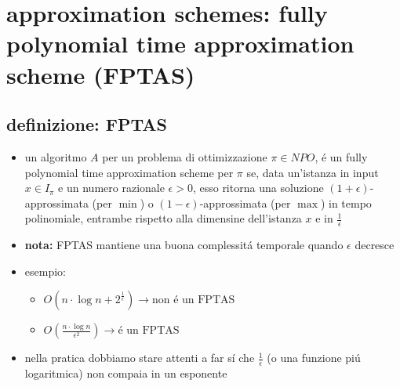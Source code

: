 \section*{approximation schemes: fully polynomial time approximation scheme (FPTAS)}


\subsection*{definizione: FPTAS}
\begin{flushleft}
	\begin{itemize}
		\item un algoritmo $A$ per un problema di ottimizzazione $\pi\in NPO$, \'e un fully polynomial time approximation scheme per $\pi$ se, data un'istanza in input $x\in I_\pi$ e un numero razionale $\epsilon>0$, esso ritorna una soluzione $(1+\epsilon)$-approssimata (per $\min$) o $(1-\epsilon)$-approssimata (per $\max$) in tempo polinomiale, entrambe rispetto alla dimensine dell'istanza $x$ e in $\frac{1}{\epsilon}$
		\item \textbf{nota:} FPTAS mantiene una buona complessit\'a temporale quando $\epsilon$ decresce
		\item esempio:
		\begin{itemize}
			\item $O(n\cdot\log n+2^\frac{1}{\epsilon})\rightarrow\text{non \'e un FPTAS}$
			\item $O(\frac{n\cdot\log n}{\epsilon^2})\rightarrow\text{\'e un FPTAS}$
		\end{itemize}
		\item nella pratica dobbiamo stare attenti a far s\'i che $\frac{1}{\epsilon}$ (o una funzione pi\'u logaritmica) non compaia in un esponente
	\end{itemize}
\end{flushleft}


